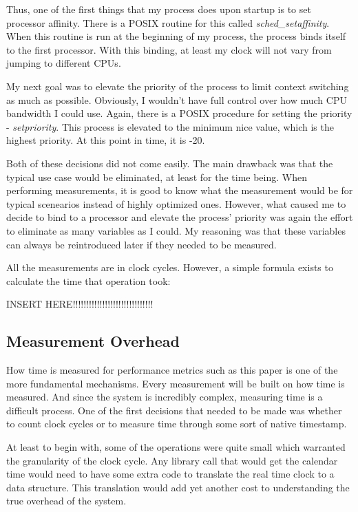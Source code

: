 \documentclass[paper=a4, fontsize=11pt]{scrartcl}
\numberwithin{equation}{section}        %
\numberwithin{figure}{section}          %
\numberwithin{table}{section}               %
\begin{document}
Thus, one of the first things that my process does upon startup is to set processor affinity.  There is a POSIX routine for this called \textit{sched\_setaffinity}.  When this routine is run at the beginning of my process, the process binds itself to the first processor.  With this binding, at least my clock will not vary from jumping to different CPUs.

My next goal was to elevate the priority of the process to limit context switching as much as possible.  Obviously, I wouldn't have full control over how much CPU bandwidth I could use.  Again, there is a POSIX procedure for setting the priority - \textit{setpriority}.  This process is elevated to the minimum nice value, which is the highest priority.  At this point in time, it is -20.

Both of these decisions did not come easily.  The main drawback was that the typical use case would be eliminated, at least for the time being.  When performing measurements, it is good to know what the measurement would be for typical scenearios instead of highly optimized ones.  However, what caused me to decide to bind to a processor and elevate the process' priority was again the effort to eliminate as many variables as I could.  My reasoning was that these variables can always be reintroduced later if they needed to be measured.

All the measurements are in clock cycles.  However, a simple formula exists to calculate the time that operation took:

INSERT HERE!!!!!!!!!!!!!!!!!!!!!!!!!!!!!!

\subsection{Measurement Overhead}

How time is measured for performance metrics such as this paper is one of the more fundamental mechanisms.  Every measurement will be built on how time is measured.  And since the system is incredibly complex, measuring time is a difficult process.  One of the first decisions that needed to be made was whether to count clock cycles or to measure time through some sort of native timestamp.

At least to begin with, some of the operations were quite small which warranted the granularity of the clock cycle.  Any library call that would get the calendar time would need to have some extra code to translate the real time clock to a data structure.  This translation would add yet another cost to understanding the true overhead of the system.
\end{document}
